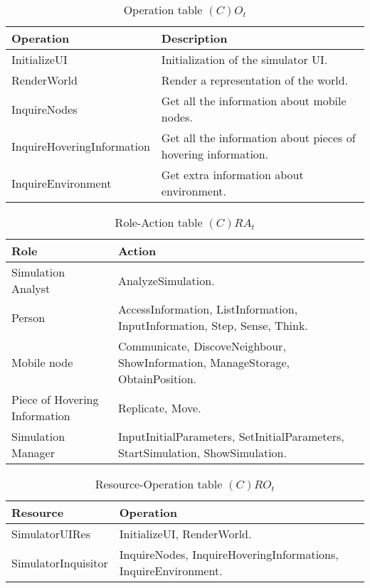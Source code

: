 \begin{table}[H]
	\centering
	\begin{tabular}{|p{5cm}|p{7cm}|}
			\hline
			\textbf{Operation} & \textbf{Description} \\
			\hline
			InitializeUI & Initialization of the simulator UI. \\
			\hline
			RenderWorld & Render a representation of the world. \\
			\hline
			InquireNodes & Get all the information about mobile nodes.\\
			\hline
			InquireHoveringInformation & Get all the information about pieces of
			hovering information.\\
			\hline
			InquireEnvironment & Get extra information about environment.\\
			\hline
		\end{tabular}
	\caption{Operation table $(C)O_t$}
	\label{tab:cot}
\end{table}

\begin{table}[H]
	\centering
	\begin{tabular}{|p{4cm}|p{8cm}|}
			\hline
			\textbf{Role} & \textbf{Action} \\
			\hline
			Simulation Analyst & AnalyzeSimulation. \\
			\hline
			Person & AccessInformation, ListInformation, InputInformation, Step,
			Sense, Think. \\
			\hline
			Mobile node & Communicate, DiscoveNeighbour, ShowInformation,
			ManageStorage, ObtainPosition.  \\
			\hline
			Piece of Hovering Information & Replicate, Move. \\
			\hline
			Simulation Manager & InputInitialParameters, SetInitialParameters,
			StartSimulation, ShowSimulation. \\
			\hline
		\end{tabular}
	\caption{Role-Action table $(C)RA_t$}
	\label{tab:rat}
\end{table}

\begin{table}[H]
	\centering
	\begin{tabular}{|p{4cm}|p{8cm}|}
			\hline
			\textbf{Resource} & \textbf{Operation} \\
			\hline
			SimulatorUIRes & InitializeUI, RenderWorld. \\
			\hline
			SimulatorInquisitor & InquireNodes, InquireHoveringInformations, InquireEnvironment. \\
			\hline
		\end{tabular}
	\caption{Resource-Operation table $(C)RO_t$}
	\label{tab:crot}
\end{table}

